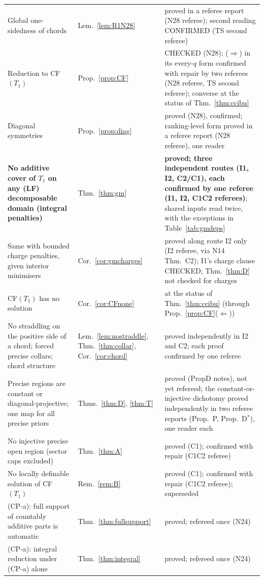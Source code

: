 \documentclass[11pt]{article}
\theoremstyle{definition}
\theoremstyle{remark}
\begin{document}
{\begin{longtable}{>{\raggedright\arraybackslash}p{6.4cm}>{\raggedright\arraybackslash}p{2.1cm}>{\raggedright\arraybackslash}p{5.6cm}}
Global one-sidedness of chords & Lem.~\ref{lem:R1N28} & proved in a referee report (N28 referee); second reading CONFIRMED (TS second referee)\\
Reduction to CF$(T_1)$ & Prop.~\ref{prop:CF} & CHECKED (N28); ($\Rightarrow$) in its every-$q$ form confirmed with repair by two referees (N28 referee, TS second referee); converse at the status of Thm.~\ref{thm:ccibu}\\
Diagonal symmetries & Prop.~\ref{prop:diag} & proved (N28), confirmed; ranking-level form proved in a referee report (N28 referee), one reader\\
\textbf{No additive cover of $T_1$ on any (LF) decomposable domain (integral penalties)} & Thm.~\ref{thm:gm} & \textbf{proved; three independent routes (I1, I2, C2/C1), each confirmed by one referee (I1, I2, C1C2 referees)}; shared inputs read twice, with the exceptions in Table~\ref{tab:gmdeps}\\
Same with bounded charge penalties, given interior minimisers & Cor.~\ref{cor:gmcharges} & proved along route I2 only (I2 referee, via N14 Thm.~C2); I1's charge clause CHECKED; Thm.~\ref{thm:D} not checked for charges\\
CF$(T_1)$ has no solution & Cor.~\ref{cor:CFnone} & at the status of Thm.~\ref{thm:ccibu} (through Prop.~\ref{prop:CF}($\Leftarrow$))\\
No straddling on the positive side of a chord; forced precise collars; chord structure & Lem.~\ref{lem:nostraddle}, Thm.~\ref{thm:collar}, Cor.~\ref{cor:chord} & proved independently in I2 and C2; each proof confirmed by one referee\\
Precise regions are constant or diagonal-projective; one map for all precise priors & Thms.~\ref{thm:D}, \ref{thm:T} & proved (PropD notes), not yet refereed; the constant-or-injective dichotomy proved independently in two referee reports (Prop.~P, Prop.~D$^*$), one reader each\\
No injective precise open region (sector caps excluded) & Thm.~\ref{thm:A} & proved (C1); confirmed with repair (C1C2 referee)\\
No locally definable solution of CF$(T_1)$ & Rem.~\ref{rem:B} & proved (C1); confirmed with repair (C1C2 referee); superseded\\
(CP-a): full support of countably additive parts is automatic & Thm.~\ref{thm:fullsupport} & proved; refereed once (N24)\\
(CP-a): integral reduction under (CP-a) alone & Thm.~\ref{thm:integral} & proved; refereed once (N24)\\

\end{longtable}}
\end{document}
